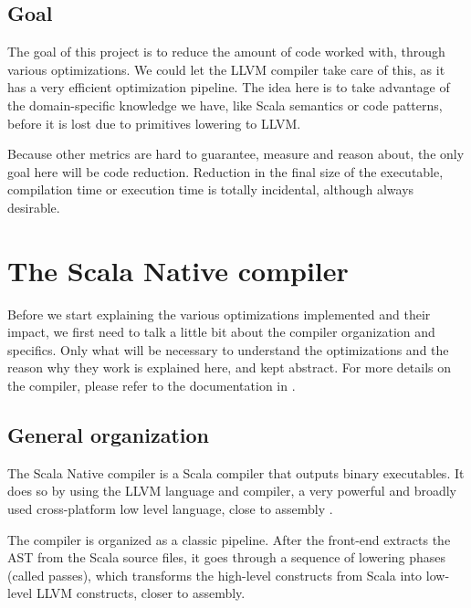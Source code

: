 \documentclass[12pt,a4paper]{article}
\begin{document}

\subsection{Goal}

The goal of this project is to reduce the amount of code worked with, through various optimizations. We could let the LLVM compiler take care of this, as it has a very efficient optimization pipeline. The idea here is to take advantage of the domain-specific knowledge we have, like Scala semantics or code patterns, before it is lost due to primitives lowering to LLVM.

Because other metrics are hard to guarantee, measure and reason about, the only goal here will be code reduction. Reduction in the final size of the executable, compilation time or execution time is totally incidental, although always desirable.

\section{The Scala Native compiler}


Before we start explaining the various optimizations implemented and their impact, we first need to talk a little bit about the compiler organization and specifics. Only what will be necessary to understand the optimizations and the reason why they work is explained here, and kept abstract. For more details on the compiler, please refer to the documentation in \cite{nativedoc}.

\subsection{General organization}

The Scala Native compiler is a Scala compiler that outputs binary executables. It does so by using the LLVM language and compiler, a very powerful and broadly used cross-platform low level language, close to assembly \cite{llvmlang}.

The compiler is organized as a classic pipeline. After the front-end extracts the AST from the Scala source files, it goes through a sequence of lowering phases (called passes), which transforms the high-level constructs from Scala into low-level LLVM constructs, closer to assembly.
\end{document}
